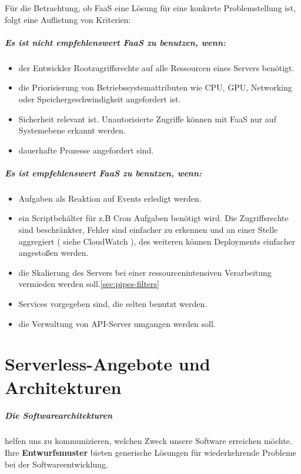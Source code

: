 \documentclass[
12pt,
english,
ngerman,
headsepline,
twoside,
openright,
numbers=noenddot,version=first
]{scrreprt}
\begin{document}
Für die Betrachtung, ob \acrshort{FaaS} eine Lösung für eine konkrete Problemstellung ist, folgt eine Auflistung von Kriterien:
\paragraph{Es ist nicht empfehlenswert \acrshort{FaaS} zu benutzen, wenn:}
\begin{itemize}
	\item der Entwickler Rootzugriffsrechte auf alle Ressourcen eines Servers benötigt.
	\item die Priorisierung von Betriebssystemattributen wie CPU, GPU, Networking oder Speichergeschwindigkeit angefordert ist.
	\item Sicherheit relevant ist. Unautorisierte Zugriffe können mit \acrshort{FaaS} nur auf Systemebene erkannt werden.
	\item dauerhafte Prozesse angefordert sind.
\end{itemize}
\paragraph{Es ist empfehlenswert \acrshort{FaaS} zu benutzen, wenn:}
\begin{itemize}
	\item Aufgaben als Reaktion auf Events erledigt werden. 
	\item ein Scriptbehälter für z.B Cron Aufgaben benötigt wird. Die Zugriffsrechte sind beschränkter, Fehler sind einfacher zu erkennen und an einer Stelle aggregiert ( siehe CloudWatch ), des weiteren können Deployments einfacher angestoßen werden.
	\item die Skalierung des Servers bei einer ressourcenintensiven Verarbeitung vermieden werden soll.\ref{sec:pipes-filters}
	\item Services vorgegeben sind, die selten benutzt werden.
	\item die Verwaltung von \acrshort{API}-Server umgangen werden soll.
\end{itemize}\cite{lambdaAWS}


\chapter{Serverless-Angebote und Architekturen}

\paragraph{Die Softwarearchitekturen} helfen uns zu kommunizieren, welchen Zweck unsere Software erreichen möchte. Ihre \textbf{Entwurfsmuster} bieten generische Lösungen für wiederkehrende Probleme bei der Softwareentwicklung.
\end{document}
